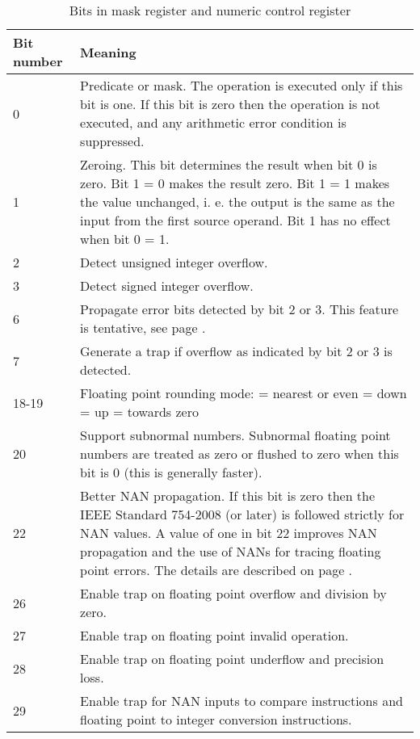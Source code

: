 \documentclass[forwardcom.tex]{subfiles}
\begin{document}
\begin{longtable}
{|p{15mm}|p{90mm}|}
\caption{Bits in mask register and numeric control register}
\label{table:maskBits}
\endfirsthead
\endhead
\hline
 Bit number & Meaning \\
 \hline
0 & Predicate or mask. The operation is executed only if this bit is one. If this bit is zero then the operation is not executed, and any arithmetic error condition is suppressed. \\
\hline
1 & Zeroing. This bit determines the result when bit 0 is zero. Bit 1 = 0 makes the result zero. Bit 1 = 1 makes the value unchanged, i. e. the output is the same as the input from the first source operand. Bit 1 has no effect when bit 0 = 1. \\
\hline
2 & Detect unsigned integer overflow. \\
\hline
3 & Detect signed integer overflow. \\
\hline
6 & Propagate error bits detected by bit 2 or 3. This feature is tentative, see page \pageref{integerOverflowDetection}. \\
\hline
7 & Generate a trap if overflow as indicated by bit 2 or 3 is detected. \\
\hline
18-19 & Floating point rounding mode: \newline
00 = nearest or even \newline
01 = down \newline
10 = up \newline
11 = towards zero \\
\hline
20 & Support subnormal numbers. Subnormal floating point numbers are treated as zero or flushed to zero when this bit is 0 (this is generally faster). \\
\hline
22 & Better NAN propagation. If this bit is zero then the IEEE Standard 754-2008 (or later) is followed strictly for NAN values. A value of one in bit 22 improves NAN propagation and the use of NANs for tracing floating point errors. The details are described on page \pageref{nanPropagation}. \\
\hline
26 & Enable trap on floating point overflow and division by zero.  \\
\hline
27 & Enable trap on floating point invalid operation. \\
\hline
28 & Enable trap on floating point underflow and precision loss. \\
\hline
29 & Enable trap for NAN inputs to compare instructions and floating point to integer conversion instructions.  \\
\hline
\end{longtable}
\end{document}

